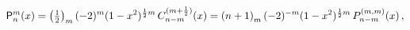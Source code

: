 \[\mathop{\mathsf{P}^{m}_{n}\/}\nolimits\!\left(x\right)=\left(\tfrac{1}{2}%
\right)_{m}(-2)^{m}(1-x^{2})^{\frac{1}{2}m}\mathop{C^{(m+\frac{1}{2})}_{n-m}\/%
}\nolimits\!\left(x\right)=\left(n+1\right)_{m}(-2)^{-m}(1-x^{2})^{\frac{1}{2}%
m}\mathop{P^{(m,m)}_{n-m}\/}\nolimits\!\left(x\right),\]